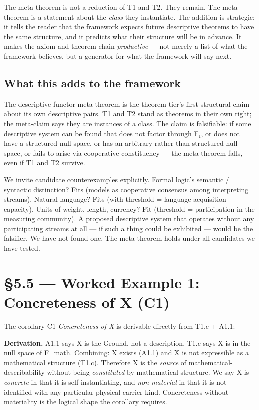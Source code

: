 \documentclass[11pt, openany]{book}
\newcommand{\sectionbreak}{\clearpage}
\begin{document}
The meta-theorem is not a reduction of T1 and T2. They remain. The meta-theorem is a statement about the \textit{class} they instantiate. The addition is strategic: it tells the reader that the framework expects future descriptive theorems to have the same structure, and it predicts what their structure will be in advance. It makes the axiom-and-theorem chain \textit{productive} --- not merely a list of what the framework believes, but a generator for what the framework will say next.

\subsection{What this adds to the framework}

The descriptive-functor meta-theorem is the theorem tier's first structural claim about its own descriptive pairs. T1 and T2 stand as theorems in their own right; the meta-claim says they are instances of a class. The claim is falsifiable: if some descriptive system can be found that does not factor through F₁, or does not have a structured null space, or has an arbitrary-rather-than-structured null space, or fails to arise via cooperative-constituency --- the meta-theorem falls, even if T1 and T2 survive.

We invite candidate counterexamples explicitly. Formal logic's semantic / syntactic distinction? Fits (models as cooperative consensus among interpreting streams). Natural language? Fits (with threshold = language-acquisition capacity). Units of weight, length, currency? Fit (threshold = participation in the measuring community). A proposed descriptive system that operates without any participating streams at all --- if such a thing could be exhibited --- would be the falsifier. We have not found one. The meta-theorem holds under all candidates we have tested.

\sectionbreak

\section{§5.5 --- Worked Example 1: Concreteness of X (C1)}

The corollary C1 \textit{Concreteness of X} is derivable directly from T1.c + A1.1:

\textbf{Derivation.} A1.1 says X is the Ground, not a description. T1.c says X is in the null space of F\_\allowbreak{}math. Combining: X exists (A1.1) and X is not expressible as a mathematical structure (T1.c). Therefore X is the \textit{source} of mathematical-describability without being \textit{constituted} by mathematical structure. We say X is \textit{concrete} in that it is self-instantiating, and \textit{non-material} in that it is not identified with any particular physical carrier-kind. Concreteness-without-materiality is the logical shape the corollary requires.
\end{document}
